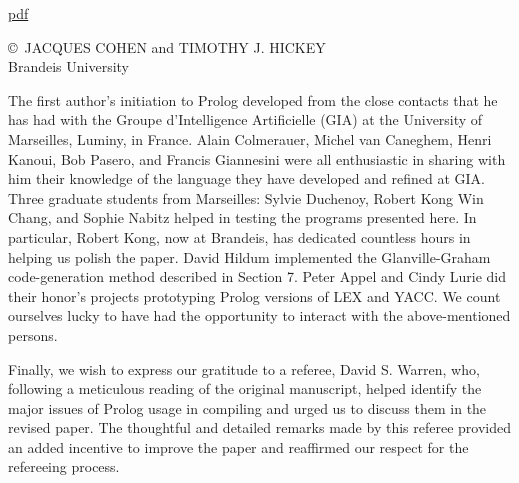 \label{cohen}\secdown
\href{https://drive.google.com/file/d/0B0u4WeMjO894eHpLcTE2bWU0SjQ/view?usp=sharing}{pdf}

\copyright\ JACQUES COHEN and TIMOTHY J. HICKEY\\
Brandeis University
\bigskip













The first author’s initiation to Prolog developed from the close contacts that he
has had with the Groupe d’Intelligence Artificielle (GIA) at the University of
Marseilles, Luminy, in France. Alain Colmerauer, Michel van Caneghem, Henri 
Kanoui, Bob Pasero, and Francis Giannesini were all enthusiastic in sharing
with him their knowledge of the language they have developed and refined at
GIA. Three graduate students from Marseilles: Sylvie Duchenoy, Robert Kong
Win Chang, and Sophie Nabitz helped in testing the programs presented here.
In particular, Robert Kong, now at Brandeis, has dedicated countless hours in
helping us polish the paper. David Hildum implemented the Glanville-Graham
code-generation method described in Section 7. Peter Appel and Cindy Lurie did
their honor’s projects prototyping Prolog versions of LEX and YACC. We count
ourselves lucky to have had the opportunity to interact with the above-mentioned
persons. 

Finally, we wish to express our gratitude to a referee, David S. Warren, who,
following a meticulous reading of the original manuscript, helped identify the
major issues of Prolog usage in compiling and urged us to discuss them in the
revised paper. The thoughtful and detailed remarks made by this referee provided
an added incentive to improve the paper and reaffirmed our respect for the
refereeing process. 



\secup